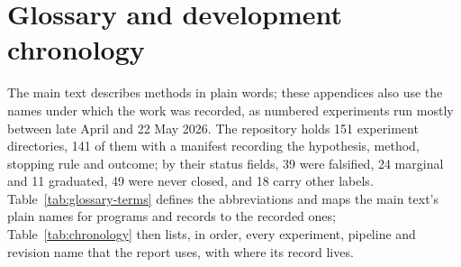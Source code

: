 \section{Glossary and development chronology}\label{app:glossary}

\providecommand{\official}{\textsc{Official}}
\providecommand{\historical}{\textsc{Historical}}
\providecommand{\measurement}{\textsc{Measurement}}
\providecommand{\reproduction}{\textsc{Reproduction}}

The main text describes methods in plain words; these appendices also use the names
under which the work was recorded, as numbered experiments run mostly between late
April and 22 May 2026. The repository holds 151 experiment directories, 141 of them
with a manifest recording the hypothesis, method, stopping rule and outcome; by their
status fields, 39 were falsified, 24 marginal and 11 graduated, 49 were never closed,
and 18 carry other labels. Table~\ref{tab:glossary-terms} defines the abbreviations
and maps the main text's plain names for programs and records to the recorded ones;
Table~\ref{tab:chronology} then lists, in order, every experiment, pipeline and
revision name that the report uses, with where its record lives.

